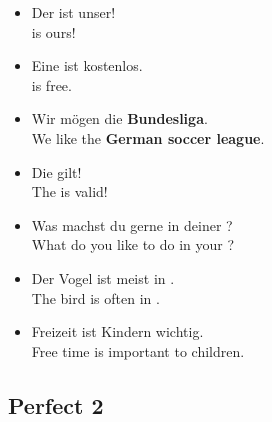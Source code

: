 \begin{itemize}
  \item  Der  ist unser! \\
   is ours!
  \item  Eine  ist kostenlos. \\
   is free.
  \item  Wir m{\"o}gen die \textbf{Bundesliga}. \\
  We like the \textbf{German soccer league}.
  \item  Die  gilt! \\
  The  is valid!
  \item  Was machst du gerne in deiner ? \\
  What do you like to do in your ?
  \item  Der Vogel ist meist in . \\
  The bird is often in .
  \item  Freizeit ist Kindern wichtig. \\
  Free time is important to children.
\end{itemize}


\pagebreak
\subsection{Perfect 2}

